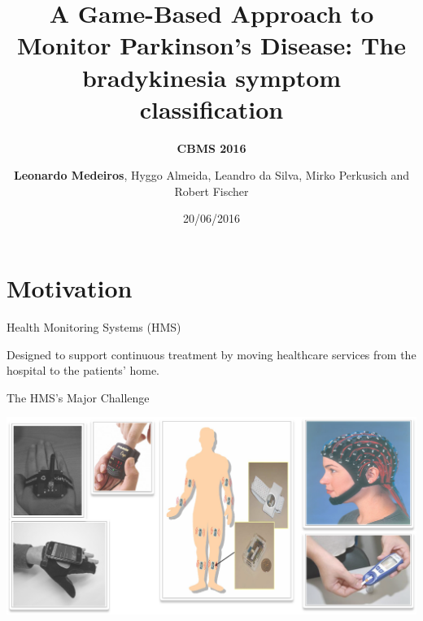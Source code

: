 \documentclass{beamer}
\author[]{\textbf{Leonardo Medeiros}, Hyggo Almeida, Leandro da Silva, Mirko Perkusich and Robert Fischer}
\date{20/06/2016}
\institute[]{Federal University Of Campina Grande - BRAZIL
}
\title{A Game-Based Approach to Monitor Parkinson's Disease: The bradykinesia symptom classification}
\subtitle{\textbf{CBMS 2016}}
\begin{document}
\begin{frame}
  \titlepage
\end{frame}

{
}






\section{Motivation}
\begin{frame}{Health Monitoring Systems (HMS)}
  \begin{block}{}
Designed to support continuous treatment by moving healthcare services from the hospital to the patients' home. 
  \end{block} 
\end{frame}

\begin{frame}{The HMS's Major Challenge}
  \begin{block}{}
  \center
      \includegraphics[height=1.8 in]{img/sismonsaude.png}
  \end{block}  
\end{frame}
\end{document}
